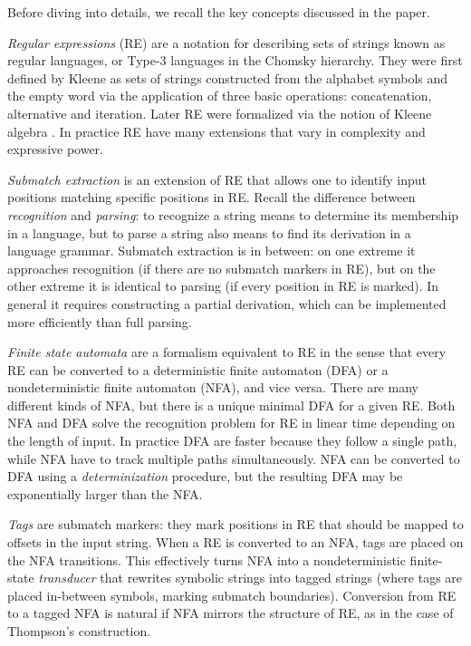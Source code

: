 \documentclass[]{article}
\begin{document}
Before diving into details, we recall the key concepts discussed in the paper.
\medskip

\emph{Regular expressions} (RE) are a notation for describing sets of strings known as regular languages, or Type-3 languages in the Chomsky hierarchy.
They were first defined by Kleene \cite{Kle51} as sets of strings constructed from the alphabet symbols and the empty word via the application of three basic operations: concatenation, alternative and iteration.
Later RE were formalized via the notion of Kleene algebra \cite{Koz94}.
In practice RE have many extensions that vary in complexity and expressive power.
\medskip

\emph{Submatch extraction} is an extension of RE that allows one to
identify input positions matching specific positions in RE.
Recall the difference between \emph{recognition} and \emph{parsing}:
to recognize a string means to determine its membership in a language,
but to parse a string also means to find its derivation in a language grammar.
Submatch extraction is in between:
on one extreme it approaches recognition (if there are no submatch markers in RE),
but on the other extreme it is identical to parsing (if every position in RE is marked).
In general it requires constructing a partial derivation,
which can be implemented more efficiently than full parsing.
\medskip

\emph{Finite state automata} are a formalism equivalent to RE
in the sense that every RE can be converted to a deterministic finite automaton (DFA)
or a nondeterministic finite automaton (NFA), and vice versa.
There are many different kinds of NFA, but there is a unique minimal DFA for a given RE.
Both NFA and DFA solve the recognition problem for RE in linear time depending on the length of input.
In practice DFA are faster because they follow a single path,
while NFA have to track multiple paths simultaneously.
NFA can be converted to DFA using a \emph{determinization} procedure,
but the resulting DFA may be exponentially larger than the NFA.
\medskip

\emph{Tags} are submatch markers: they mark positions in RE that should be mapped to offsets in the input string.
When a RE is converted to an NFA, tags are placed on the NFA transitions.
This effectively turns NFA into a nondeterministic finite-state \emph{transducer}
that rewrites symbolic strings into tagged strings (where tags are placed in-between symbols, marking submatch boundaries).
Conversion from RE to a tagged NFA is natural if NFA mirrors the structure of RE, as in the case of Thompson's construction.
\medskip
\end{document}
